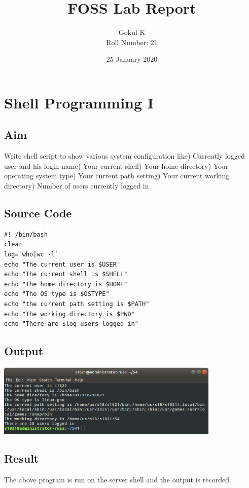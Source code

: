\documentclass{article}
\begin{document}
\title{FOSS Lab Report}
\author{Gokul K\\[2\baselineskip]
Roll Number: 21\\[2\baselineskip]}
\date{25 January 2020}

\maketitle

\setcounter{section}{3}
\section{Shell Programming I}
\subsection{Aim}
Write shell script to show various system configuration like) Currently logged user and his login name) Your current shell) Your home directory) Your operating system type) Your current path setting) Your current working directory) Number of users currently logged in\newline
\subsection{Source Code}
\begin{verbatim}
#! /bin/bash
clear
log=`who|wc -l`
echo "The current user is $USER"
echo "The current shell is $SHELL"
echo "The home directory is $HOME"
echo "The OS type is $OSTYPE"
echo "the current path setting is $PATH"
echo "The working directory is $PWD"
echo "There are $log users logged in"
\end{verbatim}

\subsection{Output}
\includegraphics[width=0.8\textwidth]{img/p4.png}

\subsection{Result}
The above program is run on the server shell and the output is recorded.
\end{document}
